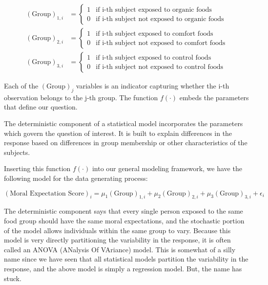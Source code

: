 \documentclass[]{book}
\theoremstyle{plain}
\theoremstyle{mydefn}
\theoremstyle{myexmpl}
\theoremstyle{remark}
\let\BeginKnitrBlock\begin \let\EndKnitrBlock\end
\let\BeginKnitrBlock\begin \let\EndKnitrBlock\end
\begin{document}
\[
\begin{aligned}
  (\text{Group})_{1,i} &= \begin{cases}
    1 & \text{if i-th subject exposed to organic foods} \\
    0 & \text{if i-th subject not exposed to organic foods} 
    \end{cases} \\
  (\text{Group})_{2,i} &= \begin{cases}
    1 & \text{if i-th subject exposed to comfort foods} \\
    0 & \text{if i-th subject not exposed to comfort foods} 
    \end{cases} \\
  (\text{Group})_{3,i} &= \begin{cases}
    1 & \text{if i-th subject exposed to control foods} \\
    0 & \text{if i-th subject not exposed to control foods}
    \end{cases}
\end{aligned}
\]

Each of the \((\text{Group})_{j}\) variables is an indicator capturing
whether the i-th observation belongs to the j-th group. The function
\(f(\cdot)\) embeds the parameters that define our question.

\BeginKnitrBlock{rmdkeyidea}
The deterministic component of a statistical model incorporates the
parameters which govern the question of interest. It is built to explain
differences in the response based on differences in group membership or
other characteristics of the subjects.
\EndKnitrBlock{rmdkeyidea}

Inserting this function \(f(\cdot)\) into our general modeling
framework, we have the following model for the data generating process:

\begin{equation}
  (\text{Moral Expectation Score})_i = \mu_1 (\text{Group})_{1,i} + \mu_2 (\text{Group})_{2,i} + \mu_3 (\text{Group})_{3,i} + \epsilon_i
  \label{eq:anova-model}
\end{equation}

The deterministic component says that every single person exposed to the
same food group should have the same moral expectations, and the
stochastic portion of the model allows individuals within the same group
to vary. Because this model is very directly partitioning the
variability in the response, it is often called an ANOVA (ANalysis Of
VAriance) model. This is somewhat of a silly name since we have seen
that all statistical models partition the variability in the response,
and the above model is simply a regression model. But, the name has
stuck.
\end{document}
